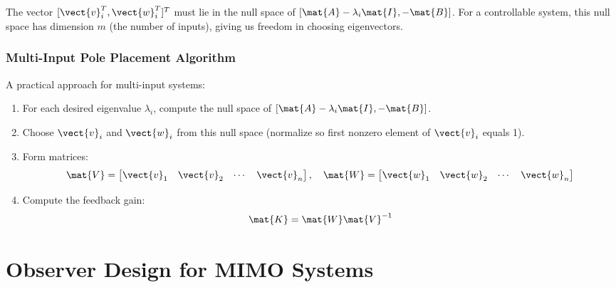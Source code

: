The vector $[\vect{v}_i^T, \vect{w}_i^T]^T$ must lie in the null space of $[\mat{A} - \lambda_i\mat{I}, -\mat{B}]$. For a controllable system, this null space has dimension $m$ (the number of inputs), giving us freedom in choosing eigenvectors.

\subsubsection{Multi-Input Pole Placement Algorithm}

A practical approach for multi-input systems:

\begin{enumerate}
    \item For each desired eigenvalue $\lambda_i$, compute the null space of $[\mat{A} - \lambda_i\mat{I}, -\mat{B}]$.

    \item Choose $\vect{v}_i$ and $\vect{w}_i$ from this null space (normalize so first nonzero element of $\vect{v}_i$ equals 1).

    \item Form matrices:
    \begin{equation}
    \mat{V} = \begin{bmatrix} \vect{v}_1 & \vect{v}_2 & \cdots & \vect{v}_n \end{bmatrix}, \quad
    \mat{W} = \begin{bmatrix} \vect{w}_1 & \vect{w}_2 & \cdots & \vect{w}_n \end{bmatrix}
    \end{equation}

    \item Compute the feedback gain:
    \begin{equation}
    \mat{K} = \mat{W}\mat{V}^{-1}
    \end{equation}
\end{enumerate}


\section{Observer Design for MIMO Systems}
\label{sec:observer_design}

